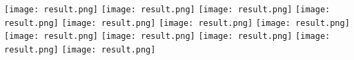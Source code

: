 \documentclass{article}
\begin{document}
	\texttt{[image: result.png]} \makebox[5mm]{}    \texttt{[image: result.png]} \makebox[5mm]{}        \texttt{[image: result.png]} \makebox[\textwidth]{}  \makebox[\textwidth]{} \makebox[\textwidth]{}  \makebox[\textwidth]{} \makebox[\textwidth]{} \makebox[\textwidth]{}  
	\texttt{[image: result.png]} \makebox[5mm]{}    \texttt{[image: result.png]} \makebox[5mm]{}        \texttt{[image: result.png]} \makebox[\textwidth]{}  \makebox[\textwidth]{} \makebox[\textwidth]{}  \makebox[\textwidth]{} \makebox[\textwidth]{} 
	\texttt{[image: result.png]} \makebox[5mm]{}    \texttt{[image: result.png]} \makebox[5mm]{}        \texttt{[image: result.png]} \makebox[\textwidth]{}  \makebox[\textwidth]{} \makebox[\textwidth]{}  \makebox[\textwidth]{} \makebox[\textwidth]{} 
	\texttt{[image: result.png]} \makebox[5mm]{}    \texttt{[image: result.png]} \makebox[5mm]{}        \texttt{[image: result.png]}
\end{document}
